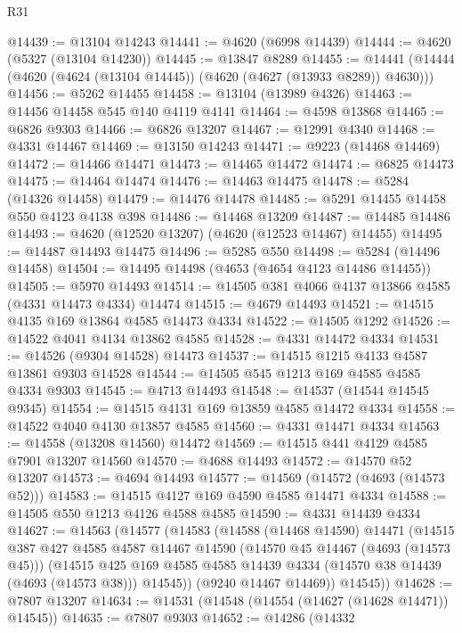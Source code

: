 \begin{lexlean}{R31}
\begin{coremodule}
@14439 := @13104 @14243
@14441 := @4620 (@6998 @14439)
@14444 := @4620 (@5327 (@13104 @14230))
@14445 := @13847 @8289
@14455 := @14441 (@14444 (@4620 (@4624 (@13104 @14445)) (@4620 (@4627 (@13933 @8289)) @4630)))
@14456 := @5262 @14455
@14458 := @13104 (@13989 @4326)
@14463 := @14456 @14458 @545 @140 @4119 @4141
@14464 := @4598 @13868
@14465 := @6826 @9303
@14466 := @6826 @13207
@14467 := @12991 @4340
@14468 := @4331 @14467
@14469 := @13150 @14243
@14471 := @9223 (@14468 @14469)
@14472 := @14466 @14471
@14473 := @14465 @14472
@14474 := @6825 @14473
@14475 := @14464 @14474
@14476 := @14463 @14475
@14478 := @5284 (@14326 @14458)
@14479 := @14476 @14478
@14485 := @5291 @14455 @14458 @550 @4123 @4138 @398
@14486 := @14468 @13209
@14487 := @14485 @14486
@14493 := @4620 (@12520 @13207) (@4620 (@12523 @14467) @14455)
@14495 := @14487 @14493 @14475
@14496 := @5285 @550
@14498 := @5284 (@14496 @14458)
@14504 := @14495 @14498 (@4653 (@4654 @4123 @14486 @14455))
@14505 := @5970 @14493
@14514 := @14505 @381 @4066 @4137 @13866 @4585 (@4331 @14473 @4334) @14474
@14515 := @4679 @14493
@14521 := @14515 @4135 @169 @13864 @4585 @14473 @4334
@14522 := @14505 @1292
@14526 := @14522 @4041 @4134 @13862 @4585
@14528 := @4331 @14472 @4334
@14531 := @14526 (@9304 @14528) @14473
@14537 := @14515 @1215 @4133 @4587 @13861 @9303 @14528
@14544 := @14505 @545 @1213 @169 @4585 @4585 @4334 @9303
@14545 := @4713 @14493
@14548 := @14537 (@14544 @14545 @9345)
@14554 := @14515 @4131 @169 @13859 @4585 @14472 @4334
@14558 := @14522 @4040 @4130 @13857 @4585
@14560 := @4331 @14471 @4334
@14563 := @14558 (@13208 @14560) @14472
@14569 := @14515 @441 @4129 @4585 @7901 @13207 @14560
@14570 := @4688 @14493
@14572 := @14570 @52 @13207
@14573 := @4694 @14493
@14577 := @14569 (@14572 (@4693 (@14573 @52)))
@14583 := @14515 @4127 @169 @4590 @4585 @14471 @4334
@14588 := @14505 @550 @1213 @4126 @4588 @4585
@14590 := @4331 @14439 @4334
@14627 := @14563
    (@14577
      (@14583
        (@14588
          (@14468 @14590)
          @14471
          (@14515
            @387
            @427
            @4585
            @4587
            @14467
            @14590
            (@14570 @45 @14467 (@4693 (@14573 @45)))
            (@14515
              @425
              @169
              @4585
              @4585
              @14439
              @4334
              (@14570 @38 @14439 (@4693 (@14573 @38)))
              @14545))
          (@9240 @14467 @14469))
        @14545))
@14628 := @7807 @13207
@14634 := @14531 (@14548 (@14554 (@14627 (@14628 @14471)) @14545))
@14635 := @7807 @9303
@14652 := @14286
    (@14332

\end{coremodule}
\end{lexlean}
